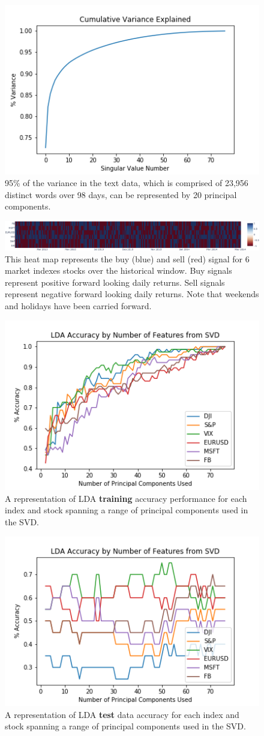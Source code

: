 \documentclass{article}
\begin{document}
\begin{figure}
    \centering
    \includegraphics[width=0.5\linewidth]{Figures/SVD_Variance_ExplainedDJI.png}
    \caption{95\% of the variance in the text data, which is comprised of 23,956 distinct words over 98 days, can be represented by 20 principal components.}
    \label{fig:SVDVar}
\end{figure}
\begin{figure}
    \centering
    \includegraphics[width=1.0\linewidth]{Figures/BuySellPlot2.png}
    \caption{This heat map represents the buy (blue) and sell (red) signal for 6 market indexes stocks over the historical window.  Buy signals represent positive forward looking daily returns.  Sell signals represent negative forward looking daily returns.  Note that weekends and holidays have been carried forward.}
    \label{fig:BuySell}
\end{figure}
\begin{figure}
    \centering
    \includegraphics[width=0.5\linewidth]{Figures/LDA_Accuracy_ALL_By_Num_Feature.png}
    \caption{A representation of LDA {\bf training} accuracy performance for each index and stock spanning a range of principal components used in the SVD.}
    \label{fig:LDAVarAll}
\end{figure}
\begin{figure}
    \centering
    \includegraphics[width=0.5\linewidth]{Figures/Test_Accuracy_ALL_By_Num_Feature.png}
    \caption{A representation of LDA {\bf test} data accuracy for each index and stock spanning a range of principal components used in the SVD.}
    \label{fig:TestPerf}
\end{figure}
\end{document}
